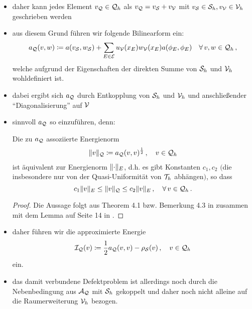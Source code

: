 \begin{itemize}
\item daher kann jedes Element $v_{\mathcal Q} \in \mathcal Q_h$  als $v_{\mathcal Q} = v_{\mathcal S} + v_{\mathcal V}$ mit $v_{\mathcal S} \in \mathcal S_h, v_{\mathcal V}\in \mathcal V_h$ geschrieben werden

\item aus diesem Grund führen wir folgende Bilinearform ein:
\begin{align*}
	a_{\mathcal Q} (v,w) \coloneqq a(v_{\mathcal S},w_{\mathcal S}) + \sum_{E \in \mathcal E} u_{\mathcal V}(x_E) w_{\mathcal V}(x_E) a(\phi_E,\phi_E) \quad \forall \, v,w \in \mathcal Q_h \, ,
\end{align*}
welche aufgrund der Eigenschaften der direkten Summe von $\mathcal S_h$ und $\mathcal V_h$ wohldefiniert ist.

\item dabei ergibt sich $a_{\mathcal Q}$ durch Entkopplung von $\mathcal S_h$ und $\mathcal V_h$ und anschließender "`Diagonalisierung"' auf $\mathcal V$

\item sinnvoll $a_{\mathcal Q}$ so einzuführen, denn:
\begin{satz}
Die zu $a_{\mathcal Q}$ assoziierte Energienorm
\begin{align*}
	\lVert v\rVert_{\mathcal Q}\coloneqq a_{\mathcal Q}(v,v)^{\frac 1 2} \, , \quad v \in \mathcal Q_h
\end{align*}
ist äquivalent zur Energienorm $\lVert \cdot\rVert_E$, d.h. es gibt Konstanten $c_1,c_2$ $($die insbesondere nur von der Quasi-Uniformität von $\mathcal T_h$ abhängen$)$, so dass
\[
	c_1 \lVert v\rVert_E \le \lVert v\rVert_{\mathcal Q} \le c_2 \lVert v\rVert_E \, , \quad \forall \, v \in \mathcal Q_h \, .
\]
\end{satz}

\begin{proof}
Die Aussage folgt aus Theorem 4.1 bzw. Bemerkung 4.3 in \cite{HoppeKorn} zusammen mit dem Lemma auf Seite 14 in \cite{Deufl}.
\end{proof}

\item daher führen wir die approximierte Energie
\begin{align}\label{eq:4.6}
	\mathcal I_{\mathcal Q} (v) \coloneqq \frac 1 2 a_{\mathcal Q}(v,v)-\rho_{\mathcal S}(v) \, , \quad v \in \mathcal Q_h 
\end{align}
ein.

\item das damit verbundene Defektproblem ist allerdings noch durch die Nebenbedingung aus $\mathcal A_{\mathcal Q}$ mit $\mathcal S_h$ gekoppelt und daher noch nicht alleine auf die Raumerweiterung $\mathcal V_h$ bezogen.


\end{itemize}
